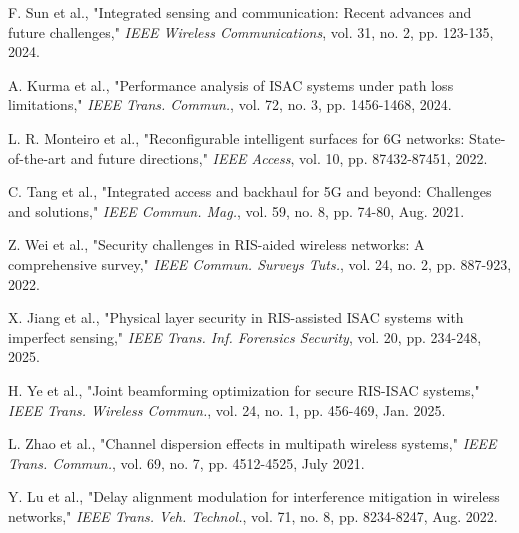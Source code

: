 \documentclass[journal]{IEEEtran}
\begin{document}

\begin{thebibliography}{10}

F. Sun et al., "Integrated sensing and communication: Recent advances and future challenges," \textit{IEEE Wireless Communications}, vol. 31, no. 2, pp. 123-135, 2024.

A. Kurma et al., "Performance analysis of ISAC systems under path loss limitations," \textit{IEEE Trans. Commun.}, vol. 72, no. 3, pp. 1456-1468, 2024.

L. R. Monteiro et al., "Reconfigurable intelligent surfaces for 6G networks: State-of-the-art and future directions," \textit{IEEE Access}, vol. 10, pp. 87432-87451, 2022.

C. Tang et al., "Integrated access and backhaul for 5G and beyond: Challenges and solutions," \textit{IEEE Commun. Mag.}, vol. 59, no. 8, pp. 74-80, Aug. 2021.

Z. Wei et al., "Security challenges in RIS-aided wireless networks: A comprehensive survey," \textit{IEEE Commun. Surveys Tuts.}, vol. 24, no. 2, pp. 887-923, 2022.

X. Jiang et al., "Physical layer security in RIS-assisted ISAC systems with imperfect sensing," \textit{IEEE Trans. Inf. Forensics Security}, vol. 20, pp. 234-248, 2025.

H. Ye et al., "Joint beamforming optimization for secure RIS-ISAC systems," \textit{IEEE Trans. Wireless Commun.}, vol. 24, no. 1, pp. 456-469, Jan. 2025.

L. Zhao et al., "Channel dispersion effects in multipath wireless systems," \textit{IEEE Trans. Commun.}, vol. 69, no. 7, pp. 4512-4525, July 2021.

Y. Lu et al., "Delay alignment modulation for interference mitigation in wireless networks," \textit{IEEE Trans. Veh. Technol.}, vol. 71, no. 8, pp. 8234-8247, Aug. 2022.

\end{thebibliography}
\end{document}
